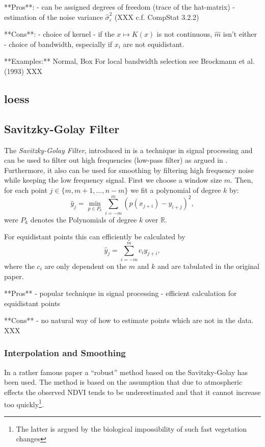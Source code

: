 **Pros**:
- can be assigned degrees of freedom (trace of the hat-matrix)
- estimation of the noise variance $\hat \sigma_\varepsilon^2$ (XXX c.f. CompStat 3.2.2)

**Cons**:
- choice of kernel
- if the $x \mapsto K(x)$ is not continuous, $\hat m $ isn't either
- choice of bandwidth, especially if $x_i$ are not equidistant.

**Examples:**
Normal, Box
For local bandwidth selection see Brockmann et al. (1993) XXX


\subsection{loess}
\label{sec:loess}


\subsection{Savitzky-Golay Filter}
\label{sec:Savitzky–Golay}
The \textit{Savitzky-Golay Filter}, introduced in \cite{savitzkySmoothingDifferentiationData1964} is a technique in signal processing and can be used to filter out high frequencies (low-pass filter) as argued in \cite{schaferWhatSavitzkyGolayFilter2011}. Furthermore, it also can be used for smoothing by filtering high frequency noise while keeping the low frequency signal.
First we choose a window size $m$. Then, for each point $j \in \{m, m+1, \dots, n-m\}$ we fit a polynomial of degree $k$ by:
$$\hat y_j=\min_{p\in P_k}\sum_{i=-m}^{m}(p (x_{j+i})-y_{i+j})^{2},$$
were $P_k$ denotes the Polynomials of degree $k$ over $\mathbb R$.

For equidistant points this can efficiently be calculated by
$$
    \hat y_{j}=\sum_{i=-m}^{m} c_{i} y_{j+i},
$$
where the $c_i$ are only dependent on the $m$ and $k$ and are tabulated in the original paper.

**Pros**
- popular technique in signal processing
- efficient calculation for equidistant points

**Cons**
- no natural way of how to estimate points which are not in the data. XXX

\subsubsection*{Interpolation and Smoothing}
In a rather famous paper \cite{chenSimpleMethodReconstructing2004a} a ``robust'' method based on the Savitzky-Golay has been used.
The method is based on the assumption that due to atmospheric effects the observed NDVI tends to be underestimated and that it cannot increase too quickly\footnote{The latter is argued by the biological impossibility of such fast vegetation changes}.


